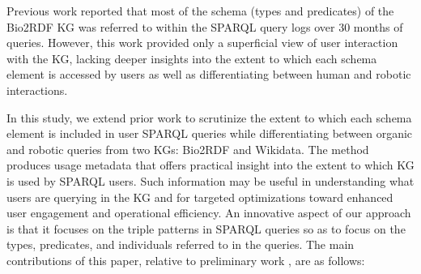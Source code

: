 \documentclass[sw]{iosart2x}
\begin{document}
Previous work \cite{mohammadi2024analyzing} reported that most of the schema (types and predicates) of the Bio2RDF KG was referred to within the SPARQL query logs over 30 months of queries. However, this work provided only a superficial view of user interaction with the KG, lacking deeper insights into the extent to which each schema element is accessed by users as well as differentiating between human and robotic interactions. 

In this study, we extend prior work \cite{mohammadi2024analyzing} to scrutinize the extent to which each schema element is included in user SPARQL queries while differentiating between organic and robotic queries from two KGs: Bio2RDF and Wikidata. The method produces usage metadata that offers practical insight into the extent to which KG is used by SPARQL users. Such information may be useful in understanding what users are querying in the KG and for targeted optimizations toward enhanced user engagement and operational efficiency. 
An innovative aspect of our approach is that it focuses on the triple patterns in SPARQL queries so as to focus on the types, predicates, and individuals referred to in the queries. The main contributions of this paper, relative to preliminary work \cite{mohammadi2024analyzing}, are as follows:
\end{document}

